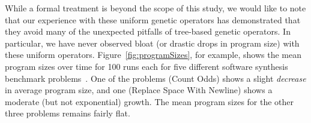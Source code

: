 \documentclass[graybox]{svmult}
\begin{document}
While a formal treatment is beyond the scope of this study, we would like to note that our experience with these uniform genetic operators has demonstrated that they avoid many of the unexpected pitfalls of tree-based genetic operators. In particular, we have never observed bloat (or drastic drops in program size) with these uniform operators. Figure~\ref{fig:programSizes}, for example, shows the mean program sizes over time for 100 runs each for five different software synthesis benchmark problems~\cite{Helmuth:2015:GECCO}. One of the problems (Count Odds) shows a slight \emph{decrease} in average program size, and one (Replace Space With Newline) shows a moderate (but not exponential) growth. The mean program sizes for the other three problems remains fairly flat.




\end{document}
